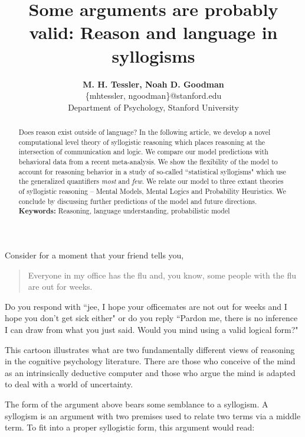 \documentclass[10pt,letterpaper]{article}
\begin{document}
\title{Some arguments are probably valid: Reason and language in syllogisms}
 
\author{{\large \bf M. H. Tessler, Noah D. Goodman } \\
	\{mhtessler, ngoodman\}@stanford.edu \\
  Department of Psychology, Stanford University}

\maketitle


\begin{abstract}
Does reason exist outside of language? In the following article, we develop a novel computational level theory of syllogistic reasoning which places reasoning at the intersection of communication and logic. We compare our model predictions with behavioral data from a recent meta-analysis. We show the flexibility of the model to account for reasoning behavior in a study of so-called ``statistical syllogisms" which use the generalized quantifiers \emph{most} and \emph{few}. We relate our model to three extant theories of syllogistic reasoning -- Mental Models, Mental Logics and Probability Heuristics. We conclude by discussing further predictions of the model and future directions.  
\\
\textbf{Keywords:} 
Reasoning, language understanding, probabilistic model
\end{abstract}
Consider for a moment that your friend tells you, 
\begin{quotation}
Everyone in my office has the flu and, you know, some people with the flu are out for weeks.
\end{quotation}
Do you respond with ``jee, I hope your officemates are not out for weeks and I hope you don't get sick either" or do you reply ``Pardon me, there is no inference I can draw from what you just said. Would you mind using a valid logical form?"

This cartoon illustrates what are two fundamentally different views of reasoning in the cognitive psychology literature. There are those who conceive of the mind as an intrinsically deductive computer and those who argue the mind is adapted to deal with a world of uncertainty. 

The form of the argument above bears some semblance to a syllogism. A syllogism is an argument with two premises used to relate two terms via a middle term. To fit into a proper syllogistic form, this argument would read:
\end{document}
